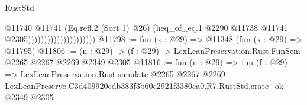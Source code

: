 \begin{lexlean}{RustStd}
\begin{coremodule}
                                          @11740
                                            @11741
                                            (Eq.refl.{2} (Sort 1) @26)
                                            (heq_of_eq.{1}
                                              @2290
                                              @11738
                                              @11741
                                              @2305)))))))))))))))))))))
@11798 := fun (x : @29) => @11348 (fun (x : @29) => @11795)
@11806 := (n : @29) -> (f : @29) -> LexLeanPreservation.Rust.FunSem @2265 @2267 @2269 @2349 @2305
@11816 := fun (n : @29) =>
  fun (f : @29) =>
  LexLeanPreservation.Rust.simulate
    @2265
    @2267
    @2269
    LexLeanPreserve.C3d409920cdb383f3b60c2921f3380ea0.R7.RustStd.crate_ok
    @2349
    @2305
\end{coremodule}
\end{lexlean}
